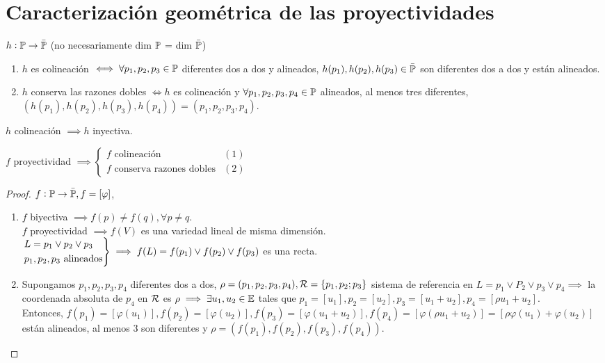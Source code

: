 \section{Caracterización geométrica de las proyectividades}

\begin{defi}
	$h : \mathbb{P} \to \bar{\mathbb{P}}$ (no necesariamente dim $\mathbb{P}$ = dim $\bar{\mathbb{P}}$)
	\begin{enumerate}
		\item $h$ es colineación $\iff \forall p_1, p_2, p_3 \in \mathbb{P}$ diferentes dos a dos y alineados, $h(p_1), h(p_2), h(p_3) \in \bar{\mathbb{P}}$ son diferentes dos a dos y están alineados.
		\item $h$ conserva las razones dobles $\iff h$ es colineación y $\forall p_1, p_2, p_3, p_4 \in \mathbb{P}$ alineados, al menos tres diferentes, $(h(p_1), h(p_2), h(p_3), h(p_4)) = (p_1, p_2, p_3, p_4)$.
	\end{enumerate}
\end{defi}
\begin{obs}
	$h$ colineación $\implies h$ inyectiva.
\end{obs}
\begin{prop}
	$f$ proyectividad $\implies \begin{cases} f \text{ colineación} & (1) \label{coli} \\ f \text{ conserva razones dobles} & (2) \label{cons_raz_dob} \end{cases}$
\end{prop}
\begin{proof}
	$f : \mathbb{P} \to \bar{\mathbb{P}}, f = [\varphi]$,
	\begin{enumerate}[(1)]
		\item $f$ biyectiva $\implies f(p) \neq f(q), \forall p \neq q$. \\
		$f$ proyectividad $\implies f(V)$ es una variedad lineal de misma dimensión. \\
		$\begin{rcases}
		L = p_1 \vee p_2 \vee p_3 \\
		p_1, p_2, p_3 \text{ alineados}
		\end{rcases}
		\implies f(L) = f(p_1) \vee f(p_2) \vee f(p_3)$ es una recta.
		\item Supongamos $p_1, p_2, p_3, p_4$ diferentes dos a dos, $\rho = (p_1, p_2, p_3, p_4), \mathcal{R} = \{p_1, p_2; p_3\}$ sistema de referencia en $L = p_1 \vee P_2 \vee p_3 \vee p_4 \implies$ la coordenada absoluta de $p_4$ en $\mathcal{R}$ es $\rho \implies \exists u_1, u_2 \in \mathbb{E}$ tales que $p_1 = [u_1], p_2 = [u_2], p_3 = [u_1 + u_2], p_4 = [\rho u_1 + u_2]$. \\
		Entonces, $f(p_1) = [\varphi(u_1)], f(p_2) = [\varphi(u_2)], f(p_3) = [\varphi(u_1 + u_2)], f(p_4) = [\varphi(\rho u_1 + u_2)] = [\rho \varphi(u_1) + \varphi(u_2)]$ están alineados, al menos 3 son diferentes y $\rho = (f(p_1), f(p_2), f(p_3), f(p_4))$.
	\end{enumerate}
\end{proof}

